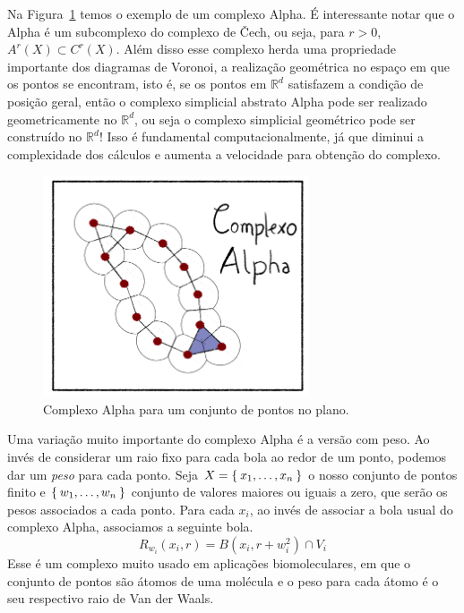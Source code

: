 Na Figura~\ref{fig:alph_ex} temos o exemplo de um complexo Alpha. É interessante
notar que o Alpha é um subcomplexo do complexo de \v{C}ech, ou seja,
para $r > 0$, $A^r(X) \subset C^r(X)$. Além disso esse complexo herda uma propriedade
importante dos diagramas de Voronoi, a realização geométrica no espaço em que os pontos
se encontram, isto é, se os pontos em $\mathbb{R}^d$ satisfazem a condição de
posição geral, então o complexo simplicial abstrato Alpha pode ser
realizado geometricamente no $\mathbb{R}^d$, ou seja o complexo simplicial geométrico
pode ser construído no $\mathbb{R}^d$! Isso é fundamental computacionalmente, já que diminui
a complexidade dos cálculos e aumenta a velocidade para obtenção do complexo.

\begin{figure}[!htpb]
  \centering
  \includegraphics[width=0.7\textwidth]{images/ComplexAlpha.png}
  \caption{Complexo Alpha para um conjunto de pontos no plano.}
  \label{fig:alph_ex}
  \fautor
\end{figure}

Uma variação muito importante do complexo Alpha é a versão com peso. Ao invés
de considerar um raio fixo para cada bola ao redor de um ponto, podemos dar
um \textit{peso} para cada ponto. Seja $X=\Set{x_1, \dots, x_n}$ o nosso
conjunto de pontos finito e $\Set{w_1, \dots, w_n}$ conjunto de valores
maiores ou iguais a zero, que serão os pesos associados a cada ponto. Para
cada $x_i$, ao invés de associar a bola usual do complexo Alpha, associamos
a seguinte bola.
\begin{equation*}
  R_{w_i}(x_i, r) = B(x_i, r + w_i^2) \cap V_i
\end{equation*}
Esse é um complexo muito usado em aplicações biomoleculares, em que o conjunto de pontos
são átomos de uma molécula e o peso para cada átomo é o seu respectivo raio de
Van der Waals.

